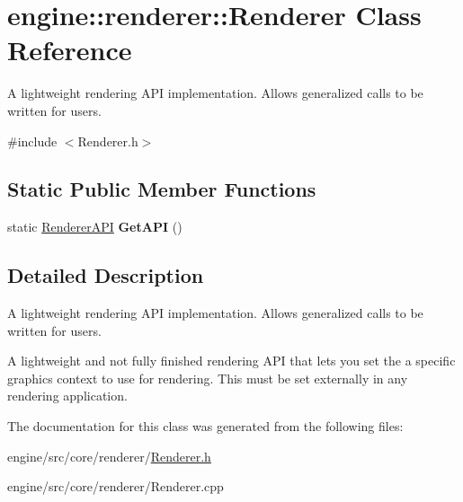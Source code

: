 \hypertarget{classengine_1_1renderer_1_1Renderer}{}\section{engine\+:\+:renderer\+:\+:Renderer Class Reference}
\label{classengine_1_1renderer_1_1Renderer}


A lightweight rendering A\+PI implementation. Allows generalized calls to be written for users.  




{\ttfamily \#include $<$Renderer.\+h$>$}

\subsection*{Static Public Member Functions}
\begin{DoxyCompactItemize}
\item 
\mbox{\label{classengine_1_1renderer_1_1Renderer_aa2fc6d152284fd3c4e66b5ecbf8ab586}} 
static \hyperlink{Renderer_8h_a0f30f1565f123b9754d5911f4a3012de}{Renderer\+A\+PI} {\bfseries Get\+A\+PI} ()
\end{DoxyCompactItemize}


\subsection{Detailed Description}
A lightweight rendering A\+PI implementation. Allows generalized calls to be written for users. 

A lightweight and not fully finished rendering A\+PI that lets you set the a specific graphics context to use for rendering. This must be set externally in any rendering application. 

The documentation for this class was generated from the following files\+:\begin{DoxyCompactItemize}
\item 
engine/src/core/renderer/\hyperlink{Renderer_8h}{Renderer.\+h}\item 
engine/src/core/renderer/Renderer.\+cpp\end{DoxyCompactItemize}
